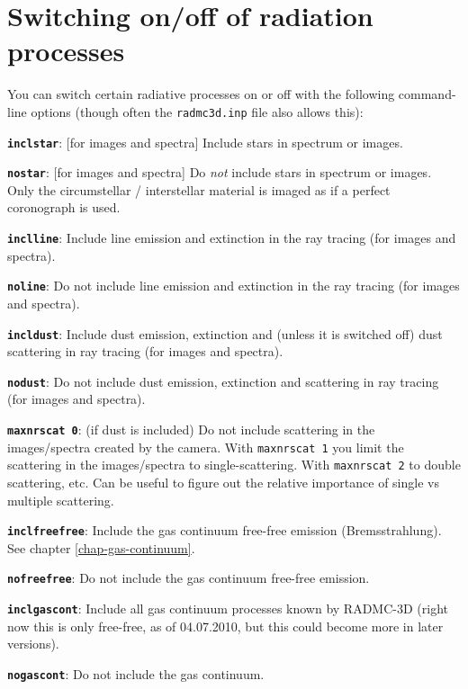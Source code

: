 \documentclass{report}
\newenvironment{options}%
  {\begin{list}{}{%
    \setlength{\topsep}{1em}%
    \setlength{\parskip}{0em}%
    \setlength{\parsep}{0em}%
    \setlength{\itemsep}{1em}%
    \setlength{\rightmargin}{0em}%
    \setlength{\leftmargin}{9em}%
    \setlength{\labelsep}{1em}%
    \setlength{\labelwidth}{6em}%
    \setlength{\itemindent}{0em}}\normalfont}%
  {\end{list}}
\begin{document}
\section{Switching on/off of radiation processes}
You can switch certain radiative processes on or off with the following
command-line options (though often the {\small\tt radmc3d.inp} file also allows this):
\begin{options}
\item[{\small\tt\bf inclstar}:\hfill] [for images and spectra] Include stars in
  spectrum or images.
\item[{\small\tt\bf nostar}:\hfill] [for images and spectra] Do {\em not} include stars
  in spectrum or images. Only the circumstellar / interstellar material is
  imaged as if a perfect coronograph is used.
\item[{\small\tt\bf inclline}:\hfill] Include line emission and extinction
  in the ray tracing (for images and spectra). 
\item[{\small\tt\bf noline}:\hfill] Do not include line emission and extinction
  in the ray tracing (for images and spectra).
\item[{\small\tt\bf incldust}:\hfill] Include dust emission, extinction and
  (unless it is switched off) dust scattering in ray tracing (for images and
  spectra).
\item[{\small\tt\bf nodust}:\hfill] Do not include dust emission, extinction and
  scattering in ray tracing (for images and spectra).
\item[{\small\tt\bf maxnrscat 0}:\hfill] (if dust is included) Do not include
  scattering in the images/spectra created by the camera. With {\small\tt maxnrscat 1}
  you limit the scattering in the images/spectra to single-scattering.
  With {\small\tt maxnrscat 2} to double scattering, etc. Can be useful to
  figure out the relative importance of single vs multiple scattering.
\item[{\small\tt\bf inclfreefree}:\hfill] Include the gas continuum free-free
  emission (Bremsstrahlung). See chapter \ref{chap-gas-continuum}.
\item[{\small\tt\bf nofreefree}:\hfill] Do not include the gas continuum
  free-free emission.
\item[{\small\tt\bf inclgascont}:\hfill] Include all gas continuum processes
  known by RADMC-3D (right now this is only free-free, as of 04.07.2010, but
  this could become more in later versions).
\item[{\small\tt\bf nogascont}:\hfill] Do not include the gas continuum.
\end{options}
\end{document}
